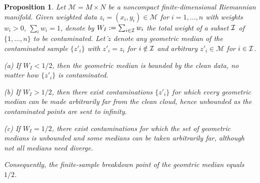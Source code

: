 \documentclass[10pt]{article}
\newtheorem{proposition}[theorem]{Proposition}
\newcommand{\calM}{\mathcal{M}}
\begin{document}
\begin{proposition}\label{theory:robustness_breakdown}
Let $\calM=M\times N$ be a noncompact finite-dimensional Riemannian manifold. Given weighted data $z_i = (x_i, y_i) \in \calM$ for $i=1, \ldots, n$ with weights $w_i>0$, $\sum_i w_i=1$, denote by $W_I:=\sum_{i\in\cal I}w_i$ the total weight of a subset $\cal I$ of $\{1, \ldots, n\}$ to be contaminated. 
Let $\tilde z$ denote any geometric median of the contaminated sample $\{z'_i\}$ with $z'_i=z_i$ for $i\notin\cal I$ and arbitrary $z'_i\in\calM$ for $i\in\cal I$.

(a) If $W_I<1/2$, then the geometric median is bounded by the clean data, no matter how $\{z'_i\}$ is contaminated.

(b) If $W_I>1/2$, then there exist contaminations $\{z'_i\}$ for which every geometric median can be made arbitrarily far from the clean cloud, hence unbounded as the contaminated points are sent to infinity. 

(c) If $W_I = 1/2$, there exist contaminations for which the set of geometric medians is unbounded and some medians can be taken arbitrarily far, although not all medians need diverge.



Consequently, the finite-sample breakdown point of the geomtric median equals $1/2$.
\end{proposition}
\end{document}

